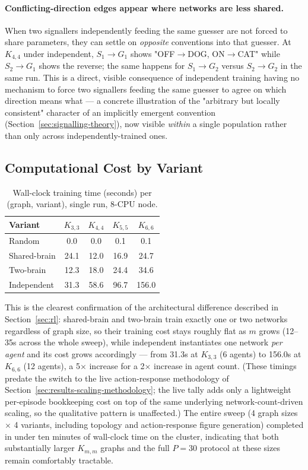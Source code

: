 \documentclass[a4paper,twoside,12pt]{report}
\begin{document}
\paragraph{Conflicting-direction edges appear where networks are less
shared.} When two signallers independently feeding the same guesser are not
forced to share parameters, they can settle on \emph{opposite} conventions
into that guesser. At $K_{4,4}$ under independent, $S_1\!\to\!G_1$ shows
"OFF$\to$DOG, ON$\to$CAT" while $S_2\!\to\!G_1$ shows the reverse; the same
happens for $S_1\!\to\!G_2$ versus $S_2\!\to\!G_2$ in the same run. This is a
direct, visible consequence of independent training having no mechanism to
force two signallers feeding the same guesser to agree on which direction
means what --- a concrete illustration of the "arbitrary but locally
consistent" character of an implicitly emergent convention
(Section~\ref{sec:signalling-theory}), now visible \emph{within} a single
population rather than only across independently-trained ones.

\subsection{Computational Cost by Variant}

\begin{table}[H]
\centering
\caption{Wall-clock training time (seconds) per (graph, variant), single
run, 8-CPU node.}
\label{tab:q1-scaling-time}
\begin{tabular}{lcccc}
\toprule
\textbf{Variant} & $K_{3,3}$ & $K_{4,4}$ & $K_{5,5}$ & $K_{6,6}$ \\
\midrule
Random       & 0.0  & 0.0  & 0.1  & 0.1 \\
Shared-brain & 24.1 & 12.0 & 16.9 & 24.7 \\
Two-brain    & 12.3 & 18.0 & 24.4 & 34.6 \\
Independent  & 31.3 & 58.6 & 96.7 & 156.0 \\
\bottomrule
\end{tabular}
\end{table}

This is the clearest confirmation of the architectural difference described
in Section~\ref{sec:rl}: shared-brain and two-brain train exactly one or two
networks regardless of graph size, so their training cost stays roughly flat
as $m$ grows (12--35s across the whole sweep), while independent instantiates
one network \emph{per agent} and its cost grows accordingly --- from 31.3s at
$K_{3,3}$ (6 agents) to 156.0s at $K_{6,6}$ (12 agents), a 5$\times$ increase
for a 2$\times$ increase in agent count. (These timings predate the
switch to the live action-response methodology of
Section~\ref{sec:results-scaling-methodology}; the live tally adds only a
lightweight per-episode bookkeeping cost on top of the same underlying
network-count-driven scaling, so the qualitative pattern is unaffected.) The
entire sweep (4 graph sizes $\times$ 4 variants, including topology and
action-response figure generation) completed in under ten minutes of
wall-clock time on the cluster, indicating that both substantially larger
$K_{m,m}$ graphs and the full $P=30$ protocol at these sizes remain
comfortably tractable.
\end{document}
